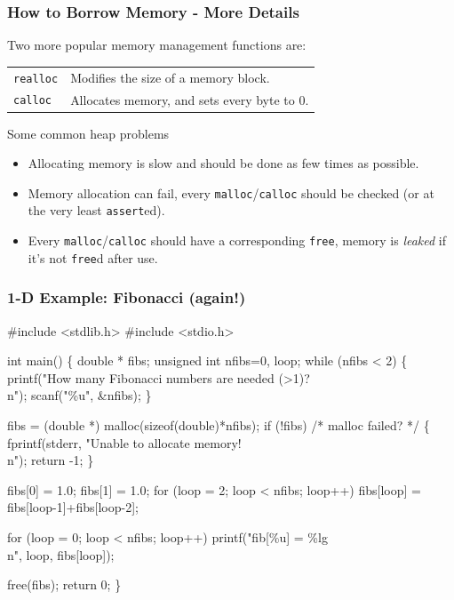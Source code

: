 \documentclass[table]{beamer}
\newif\ifschigh\schighfalse
\newcommand{\kw}[1]{\ifschigh\textcolor{red}{#1}\else\textcolor{keyword}{#1}\fi}
\newcommand{\kt}[1]{\ifschigh\textcolor{red}{#1}\else\textcolor{ctext}{#1}\fi}
\newcommand{\kc}[1]{\ifschigh\textcolor{red}{#1}\else\textcolor{comment}{#1}\fi}
\newcounter{sckll}
\newcommand{\kr}{\setcounter{sckll}{1}}
\newcommand{\kl}{}
\begin{document}
\begin{frame}
\frametitle{How to Borrow Memory - More Details}
Two more popular memory management functions are:
\begin{center}
\begin{tabular}{l l}
\tt realloc&Modifies the size of a memory block.\\
\tt calloc&Allocates memory, and sets every byte to 0.\\
\end{tabular}
\end{center}
\begin{alertblock}{Some common heap problems}
\begin{itemize}
\item Allocating memory is slow and should be done as few times as possible.
\item Memory allocation can fail, every {\tt malloc}/{\tt calloc} should be checked (or at the very least {\tt assert}ed).
\item Every {\tt malloc}/{\tt calloc} should have a corresponding {\tt free}, memory is \emph{leaked} if it's not {\tt free}d after use.
\end{itemize}
\end{alertblock}
\end{frame}

\begin{frame}[fragile]
\frametitle{1-D Example: Fibonacci (again!)}
\begin{semiverbatim}
\tiny
\kr\kl\kw{\#include} \kt{<stdlib.h>}
\kl\kw{\#include} \kt{<stdio.h>}
\kl
\kl\kw{int} main()
\kl\{
\kl   \kw{double} * fibs;
\kl   \kw{unsigned int} nfibs=0, loop;
\kl   \kw{while} (nfibs < 2)
\kl   \{
\kl      printf(\kt{"How many Fibonacci numbers are needed (>1)?\\n"});
\kl      scanf(\kt{"\%u"}, \&nfibs);
\kl   \}
\kl   
\kl   fibs = (\kw{double} *) malloc(\kw{sizeof}(\kw{double})*nfibs);
\kl   \kw{if} (!fibs) \kc{/* malloc failed? */}
\kl   \{
\kl      fprintf(stderr, \kt{"Unable to allocate memory!\\n"});
\kl      \kw{return} -1;
\kl   \}       
\kl   
\kl   fibs[0] = 1.0; fibs[1] = 1.0;
\kl   \kw{for} (loop = 2; loop < nfibs; loop++)
\kl      fibs[loop] = fibs[loop-1]+fibs[loop-2];
\kl      
\kl   \kw{for} (loop = 0; loop < nfibs; loop++)
\kl      printf(\kt{"fib[\%u] = \%lg\\n"}, loop, fibs[loop]);
\kl      
\kl   free(fibs);
\kl   \kw{return} 0;
\kl\}
\end{semiverbatim}
\end{frame}
\end{document}
